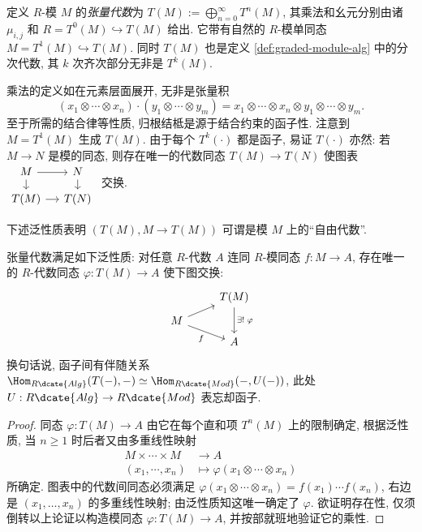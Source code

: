 \begin{definition}[张量代数]
	定义 $R$-模 $M$ 的\emph{张量代数}为 $T(M) := \bigoplus_{n=0}^\infty T^n(M)$, 其乘法和幺元分别由诸 $\mu_{i,j}$ 和 $R = T^0(M) \hookrightarrow T(M)$ 给出. 它带有自然的 $R$-模单同态 $M = T^1(M) \hookrightarrow T(M)$. 同时 $T(M)$ 也是定义 \ref{def:graded-module-alg} 中的分次代数, 其 $k$ 次齐次部分无非是 $T^k(M)$.
\end{definition}
乘法的定义如在元素层面展开, 无非是张量积
\[ (x_1 \otimes \cdots \otimes x_n) \cdot (y_1 \otimes \cdots \otimes y_m) = x_1 \otimes \cdots \otimes x_n \otimes y_1 \otimes \cdots \otimes y_m. \]
至于所需的结合律等性质, 归根结柢是源于结合约束的函子性. 注意到 $M = T^1(M)$ 生成 $T(M)$. 由于每个 $T^k(\cdot)$ 都是函子, 易证 $T(\cdot)$ 亦然: 若 $M \to N$ 是模的同态, 则存在唯一的代数同态 $T(M) \to T(N)$ 使图表
$\begin{tikzcd}[row sep=small, column sep=small]
	M \arrow[r] \arrow[d] & N \arrow[d] \\
	T(M) \arrow[r] & T(N)
\end{tikzcd}$
交换.

下述泛性质表明 $(T(M), M \to T(M))$ 可谓是模 $M$ 上的``自由代数''.
\begin{theorem}\label{prop:tensor-alg-universal}
	张量代数满足如下泛性质: 对任意 $R$-代数 $A$ 连同 $R$-模同态 $f: M \to A$, 存在唯一的 $R$-代数同态 $\varphi: T(M) \to A$ 使下图交换:
	\[\begin{tikzcd}[row sep=tiny]
		& T(M) \arrow[dd, "\exists! \;\varphi"] \\
		M \arrow[ru] \arrow[rd, "f"'] & \\
		& A
	\end{tikzcd}\]
	换句话说, 函子间有伴随关系 $\Hom_{R\dcate{Alg}}(T(-), -) \simeq \Hom_{R\dcate{Mod}}(-, U(-))$, 此处 $U: R\dcate{Alg} \to R\dcate{Mod}$ 表忘却函子.
\end{theorem}
\begin{proof}
	同态 $\varphi: T(M) \to A$ 由它在每个直和项 $T^n(M)$ 上的限制确定, 根据泛性质, 当 $n \geq 1$ 时后者又由多重线性映射
	\begin{align*}
		M \times \cdots \times M & \longrightarrow A \\
		(x_1, \cdots, x_n) & \longmapsto \varphi(x_1 \otimes \cdots \otimes x_n)
	\end{align*}
	所确定. 图表中的代数间同态必须满足 $\varphi(x_1 \otimes \cdots \otimes x_n) = f(x_1) \cdots f(x_n)$, 右边是 $(x_1, \ldots, x_n)$ 的多重线性映射; 由泛性质知这唯一确定了 $\varphi$. 欲证明存在性, 仅须倒转以上论证以构造模同态 $\varphi: T(M) \to A$, 并按部就班地验证它的乘性.
\end{proof}

